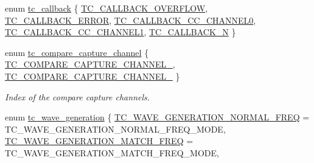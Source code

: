 \begin{DoxyCompactItemize}
\item 
enum \mbox{\hyperlink{group__asfdoc__sam0__tc__group_ga7d3fb5365e46bd4efae2885bd508067f}{tc\+\_\+callback}} \{ \newline
\mbox{\hyperlink{group__asfdoc__sam0__tc__group_gga7d3fb5365e46bd4efae2885bd508067fade9a99ec0d7386cfff45671de03b8b6a}{T\+C\+\_\+\+C\+A\+L\+L\+B\+A\+C\+K\+\_\+\+O\+V\+E\+R\+F\+L\+OW}}, 
\mbox{\hyperlink{group__asfdoc__sam0__tc__group_gga7d3fb5365e46bd4efae2885bd508067fab6fb975aff8c4ace0dbece4bf825332b}{T\+C\+\_\+\+C\+A\+L\+L\+B\+A\+C\+K\+\_\+\+E\+R\+R\+OR}}, 
\mbox{\hyperlink{group__asfdoc__sam0__tc__group_gga7d3fb5365e46bd4efae2885bd508067fa03e7143b9984e00ad432db650abd69c6}{T\+C\+\_\+\+C\+A\+L\+L\+B\+A\+C\+K\+\_\+\+C\+C\+\_\+\+C\+H\+A\+N\+N\+E\+L0}}, 
\mbox{\hyperlink{group__asfdoc__sam0__tc__group_gga7d3fb5365e46bd4efae2885bd508067fae16450d1f8ef97cc1b129524b72efdf3}{T\+C\+\_\+\+C\+A\+L\+L\+B\+A\+C\+K\+\_\+\+C\+C\+\_\+\+C\+H\+A\+N\+N\+E\+L1}}, 
\newline
\mbox{\hyperlink{group__asfdoc__sam0__tc__group_gga7d3fb5365e46bd4efae2885bd508067faf76c479c366d3c15450245bb4ee9a856}{T\+C\+\_\+\+C\+A\+L\+L\+B\+A\+C\+K\+\_\+N}}
 \}
\item 
enum \mbox{\hyperlink{group__asfdoc__sam0__tc__group_ga01eca97dbfd588fd3ba0dcfd4792d857}{tc\+\_\+compare\+\_\+capture\+\_\+channel}} \{ \mbox{\hyperlink{group__asfdoc__sam0__tc__group_gga01eca97dbfd588fd3ba0dcfd4792d857a5f6651d829a75778a759ce5a519b76a4}{T\+C\+\_\+\+C\+O\+M\+P\+A\+R\+E\+\_\+\+C\+A\+P\+T\+U\+R\+E\+\_\+\+C\+H\+A\+N\+N\+E\+L\+\_}}, 
\mbox{\hyperlink{group__asfdoc__sam0__tc__group_gga01eca97dbfd588fd3ba0dcfd4792d857a8fcf38e3b831977347028475b5583141}{T\+C\+\_\+\+C\+O\+M\+P\+A\+R\+E\+\_\+\+C\+A\+P\+T\+U\+R\+E\+\_\+\+C\+H\+A\+N\+N\+E\+L\+\_}}
 \}
\begin{DoxyCompactList}\small\item\em Index of the compare capture channels. \end{DoxyCompactList}\item 
enum \mbox{\hyperlink{group__asfdoc__sam0__tc__group_gae7f1302b7e3d675e471a554668b49d64}{tc\+\_\+wave\+\_\+generation}} \{ \mbox{\hyperlink{group__asfdoc__sam0__tc__group_ggae7f1302b7e3d675e471a554668b49d64a544e51b015f20263a9499ce28a0596e7}{T\+C\+\_\+\+W\+A\+V\+E\+\_\+\+G\+E\+N\+E\+R\+A\+T\+I\+O\+N\+\_\+\+N\+O\+R\+M\+A\+L\+\_\+\+F\+R\+EQ}} = T\+C\+\_\+\+W\+A\+V\+E\+\_\+\+G\+E\+N\+E\+R\+A\+T\+I\+O\+N\+\_\+\+N\+O\+R\+M\+A\+L\+\_\+\+F\+R\+E\+Q\+\_\+\+M\+O\+DE, 
\mbox{\hyperlink{group__asfdoc__sam0__tc__group_ggae7f1302b7e3d675e471a554668b49d64a4c9b3fe1ad9a1d2c0f5d8544c0923b9f}{T\+C\+\_\+\+W\+A\+V\+E\+\_\+\+G\+E\+N\+E\+R\+A\+T\+I\+O\+N\+\_\+\+M\+A\+T\+C\+H\+\_\+\+F\+R\+EQ}} = T\+C\+\_\+\+W\+A\+V\+E\+\_\+\+G\+E\+N\+E\+R\+A\+T\+I\+O\+N\+\_\+\+M\+A\+T\+C\+H\+\_\+\+F\+R\+E\+Q\+\_\+\+M\+O\+DE, 

\end{DoxyCompactItemize}
